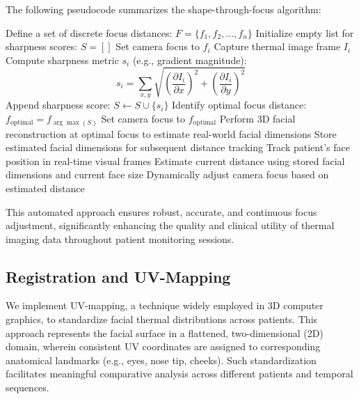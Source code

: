 The following pseudocode summarizes the shape-through-focus algorithm:

\begin{algorithm}[H]
  \caption{Automated Shape-Through-Focus Algorithm}
  \begin{algorithmic}[1]
    \State Define a set of discrete focus distances: $F = \{f_1, f_2, \dots, f_n\}$
    \State Initialize empty list for sharpness scores: $S = []$
    \State Set camera focus to $f_i$
    \State Capture thermal image frame $I_i$
    \State Compute sharpness metric $s_i$ (e.g., gradient magnitude):
    \[
      s_i = \sum_{x,y} \sqrt{\left(\frac{\partial I_i}{\partial x}\right)^2 + \left(\frac{\partial I_i}{\partial y}\right)^2}
    \]
    \State Append sharpness score: $S \leftarrow S \cup \{s_i\}$
    \EndFor
    \State Identify optimal focus distance: $f_{\text{optimal}} = f_{\arg\max(S)}$
    \State Set camera focus to $f_{\text{optimal}}$
    \State Perform 3D facial reconstruction at optimal focus to estimate real-world facial dimensions
    \State Store estimated facial dimensions for subsequent distance tracking
    \State Track patient's face position in real-time visual frames
    \State Estimate current distance using stored facial dimensions and current face size
    \State Dynamically adjust camera focus based on estimated distance
    \EndWhile
  \end{algorithmic}
\end{algorithm}

This automated approach ensures robust, accurate, and continuous focus adjustment, significantly enhancing the quality and clinical utility of thermal imaging data throughout patient monitoring sessions.

\subsection{Registration and UV-Mapping}
\label{sec:registration}

We implement UV-mapping, a technique widely employed in 3D computer graphics, to standardize facial thermal distributions across patients. This approach represents the facial surface in a flattened, two-dimensional (2D) domain, wherein consistent UV coordinates are assigned to corresponding anatomical landmarks (e.g., eyes, nose tip, cheeks). Such standardization facilitates meaningful comparative analysis across different patients and temporal sequences.

